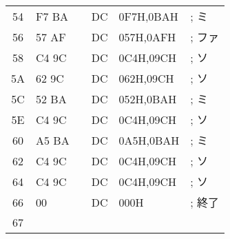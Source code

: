 \begin{center}
{\begin{tabular}{|c|l|l|l l l|}
54 & F7 BA        &         & DC     & 0F7H,0BAH   &   ; ミ\\
56 & 57 AF        &         & DC     & 057H,0AFH   &   ; ファ\\
58 & C4 9C        &         & DC     & 0C4H,09CH   &   ; ソ\\
5A & 62 9C        &         & DC     & 062H,09CH   &   ; ソ\\
5C & 52 BA        &         & DC     & 052H,0BAH   &   ; ミ\\
5E & C4 9C        &         & DC     & 0C4H,09CH   &   ; ソ\\
60 & A5 BA        &         & DC     & 0A5H,0BAH   &   ; ミ\\
62 & C4 9C        &         & DC     & 0C4H,09CH   &   ; ソ\\
64 & C4 9C        &         & DC     & 0C4H,09CH   &   ; ソ\\
66 & 00           &         & DC     & 000H        &   ; 終了\\
67 &              &         &        &             &   \\
\hline
\end{tabular}
}
\end{center}
